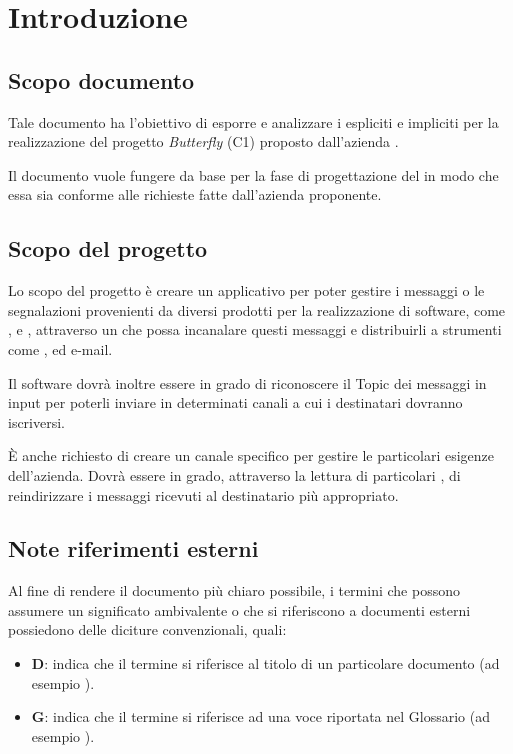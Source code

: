 \section{Introduzione}

	\subsection{Scopo documento}
	Tale documento ha l'obiettivo di esporre e analizzare i  espliciti e impliciti per la realizzazione del progetto \textit{Butterfly} (C1) proposto dall'azienda \II.

	Il documento vuole fungere da base per la fase di progettazione del  in modo che essa sia conforme alle richieste fatte dall'azienda proponente.

	\subsection{Scopo del progetto}
	Lo scopo del progetto è creare un applicativo per poter gestire i messaggi o le segnalazioni provenienti da diversi prodotti per la realizzazione di software,
	come ,  e , attraverso un  che possa incanalare questi messaggi e distribuirli a strumenti come
	,  ed e-mail.

	Il software dovrà inoltre essere in grado di riconoscere il Topic dei messaggi in input per poterli inviare in determinati canali a cui i destinatari dovranno
	iscriversi.

	\`E anche richiesto di creare un canale specifico per gestire le particolari esigenze dell'azienda. Dovrà essere in grado, attraverso la lettura di particolari
	, di reindirizzare i messaggi ricevuti al destinatario più appropriato.

	\subsection{Note riferimenti esterni}
	Al fine di rendere il documento più chiaro possibile, i termini che possono assumere un significato ambivalente o che si riferiscono a documenti esterni
	possiedono delle diciture convenzionali, quali:

	\begin{itemize}
		\item \textbf{D}: indica che il termine si riferisce al titolo di un particolare documento (ad esempio \Doc{\PdPv}).
		\item \textbf{G}: indica che il termine si riferisce ad una voce riportata nel Glossario (ad esempio ).
	\end{itemize}

